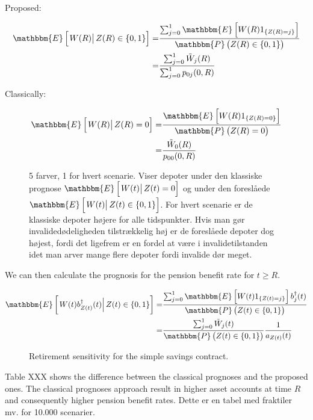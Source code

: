 \documentclass{book}
\newcommand{\1}[1]{\mathbbm{1}_{\left\lbrace #1 \right\rbrace}}
\newcommand{\expec}[1][def]{\mathbbm{E} \left[ #1 \right]}
\newcommand{\econd}[2][def]{\mathbbm{E} \left[ \left. #1 \right| #2 \right]}
\newcommand{\probability}[1][def]{\mathbbm{P} \left( #1 \right)}
\theoremstyle{break}
\theoremstyle{remark}
\numberwithin{equation}{section}
\begin{document}
\begin{example}
Proposed:

\begin{align*}
\econd[W(R)]{Z(R) \in \{0,1\}} =& \frac{\sum_{j =0}^1 \expec[W(R) 1_{\{Z(R)=j\}}]}{\probability[Z(R) \in \{0,1\}]} \\
=& \frac{\sum_{j =0}^1 \tilde{W}_j(R)}{\sum_{j =0}^1 p_{0j}(0,R)}
\end{align*}

Classically:

\begin{align*}
\econd[W(R)]{Z(R) = 0} =& \frac{\expec[W(R) 1_{\{Z(R)=0\}}]}{\probability[Z(R) = 0]} \\
=& \frac{\tilde{W}_0(R)}{p_{00}(0,R)}
\end{align*} 

\begin{figure}[H]
	\caption{5 farver, 1 for hvert scenarie. Viser depoter under den klassiske prognose $\econd[W(t)]{Z(t) = 0}$ og under den foreslåede $\econd[W(t)]{Z(t) \in \{0,1\}}$. For hvert scenarie er de klassiske depoter højere for alle tidspunkter. Hvis man gør invalidedødeligheden tilstrækkelig høj er de foreslåede depoter dog højest, fordi det ligefrem er en fordel at være i invalidetilstanden idet man arver mange flere depoter fordi invalide dør meget.}
\end{figure}

We can then calculate the prognosis for the pension benefit rate for $ t\geq R$.

\begin{align*}
\econd[W(t) b_{Z(t)}^\dagger(t)]{Z(t) \in \{0,1\}} =& \frac{\sum_{j =0}^1 \expec[W(t) 1_{\{Z(t)=j\}}] b_j^{\dagger}(t)}{\probability[Z(t) \in \{0,1\}]} \\
=& \frac{\sum_{j =0}^1 \tilde{W}_j(t)}{\probability[Z(t) \in \{0,1\}]} \frac{1}{a_{Z(t)}(t)}
\end{align*}

\begin{figure}[H] \label{RSensiGraph}
	\centering
	\caption{Retirement sensitivity for the simple savings contract.}
\end{figure}

Table XXX shows the difference between the classical prognoses and the proposed ones. The classical prognoses approach result in higher asset accounts at time $R$ and consequently higher pension benefit rates. Dette er en tabel med fraktiler mv. for 10.000 scenarier.

\end{example}
\end{document}
